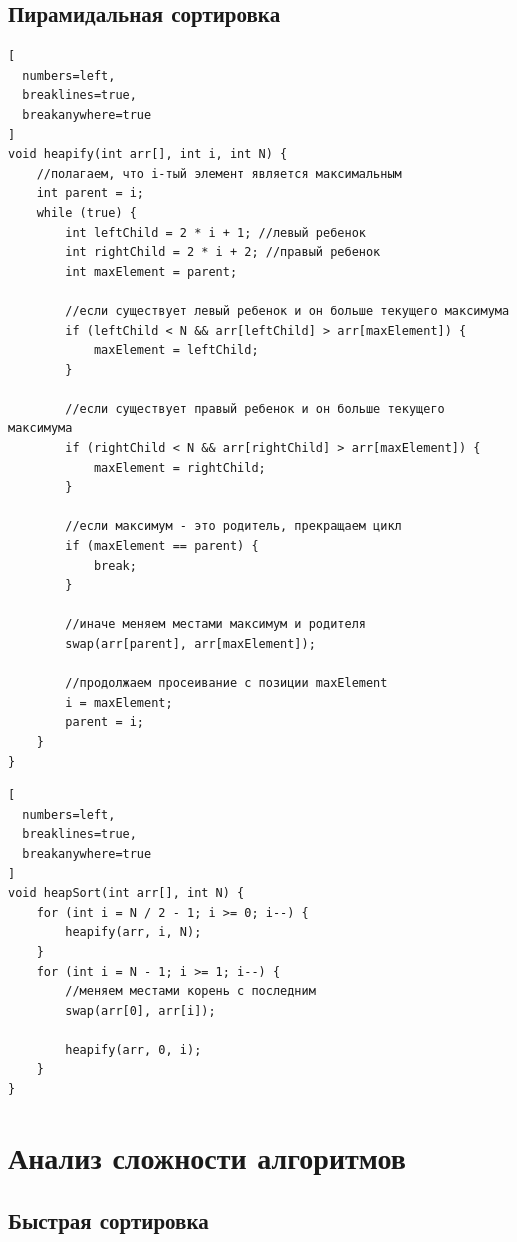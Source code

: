 \documentclass[otchet]{SCWorks}
\begin{document}
\subsection{Пирамидальная сортировка}

\begin{Verbatim}[
  numbers=left,
  breaklines=true,
  breakanywhere=true
]
void heapify(int arr[], int i, int N) {
    //полагаем, что i-тый элемент является максимальным
    int parent = i;
    while (true) {
        int leftChild = 2 * i + 1; //левый ребенок
        int rightChild = 2 * i + 2; //правый ребенок
        int maxElement = parent;

        //если существует левый ребенок и он больше текущего максимума
        if (leftChild < N && arr[leftChild] > arr[maxElement]) {
            maxElement = leftChild;
        }

        //если существует правый ребенок и он больше текущего максимума
        if (rightChild < N && arr[rightChild] > arr[maxElement]) {
            maxElement = rightChild;
        }

        //если максимум - это родитель, прекращаем цикл
        if (maxElement == parent) {
            break;
        }

        //иначе меняем местами максимум и родителя
        swap(arr[parent], arr[maxElement]);

        //продолжаем просеивание с позиции maxElement
        i = maxElement;
        parent = i;
    }
}
\end{Verbatim}

\begin{Verbatim}[
  numbers=left,
  breaklines=true,
  breakanywhere=true
]
void heapSort(int arr[], int N) {
    for (int i = N / 2 - 1; i >= 0; i--) {
        heapify(arr, i, N);
    }
    for (int i = N - 1; i >= 1; i--) {
        //меняем местами корень с последним
        swap(arr[0], arr[i]);

        heapify(arr, 0, i);
    }
}
\end{Verbatim}


\newpage

\section{Анализ сложности алгоритмов}

\subsection{Быстрая сортировка}
\end{document}
